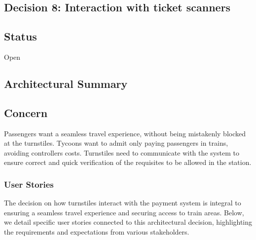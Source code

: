 \subsection{Decision 8: Interaction with ticket scanners}

\subsection*{Status}
Open
\subsection*{Architectural Summary}


\subsection*{Concern}
Passengers want a seamless travel experience, without being mistakenly blocked at the turnstiles.
Tycoons want to admit only paying passengers in trains, avoiding controllers costs.
Turnstiles need to communicate with the system to ensure correct and quick verification of the requisites to be allowed in the station.

\subsubsection*{User Stories}
The decision on how turnstiles interact with the payment system is integral to ensuring a seamless travel experience and securing access to train areas. Below, we detail specific user stories connected to this architectural decision, highlighting the requirements and expectations from various stakeholders.

